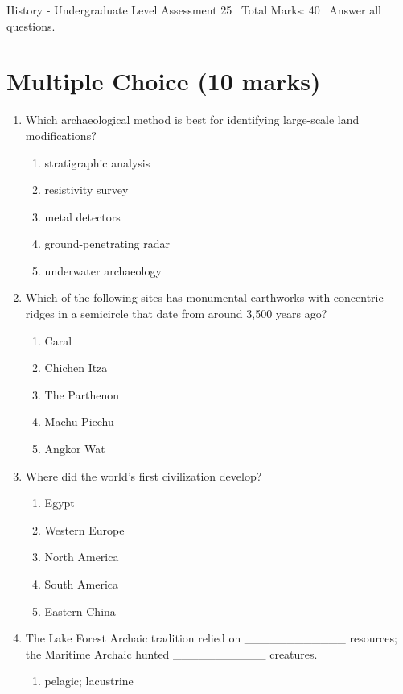\documentclass[12pt]{article}
\begin{document}
\begin{center}
History - Undergraduate Level Assessment 25 \
Total Marks: 40 \
Answer all questions.
\end{center}

\section*{Multiple Choice (10 marks)}
\begin{enumerate}[label=\arabic*.]
\item Which archaeological method is best for identifying large-scale land modifications?
\begin{enumerate}[label=(\alph*)]
    \item stratigraphic analysis
    \item resistivity survey
    \item metal detectors
    \item ground-penetrating radar
    \item underwater archaeology
\end{enumerate}
\item Which of the following sites has monumental earthworks with concentric ridges in a semicircle that date from around 3,500 years ago?
\begin{enumerate}[label=(\alph*)]
    \item Caral
    \item Chichen Itza
    \item The Parthenon
    \item Machu Picchu
    \item Angkor Wat
\end{enumerate}
\item Where did the world's first civilization develop?
\begin{enumerate}[label=(\alph*)]
    \item Egypt
    \item Western Europe
    \item North America
    \item South America
    \item Eastern China
\end{enumerate}
\item The Lake Forest Archaic tradition relied on \_\_\_\_\_\_\_\_\_\_\_\_ resources; the Maritime Archaic hunted \_\_\_\_\_\_\_\_\_\_\_ creatures.
\begin{enumerate}[label=(\alph*)]
    \item pelagic; lacustrine

\end{enumerate}
\end{enumerate}
\end{document}

